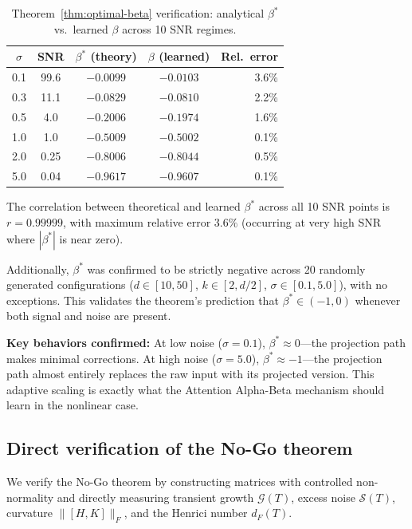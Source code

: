 \documentclass[11pt,a4paper]{article}
\theoremstyle{definition}
\begin{document}
\begin{table}[h]
\centering
\caption{Theorem~\ref{thm:optimal-beta} verification: analytical $\beta^*$
vs.\ learned $\beta$ across 10 SNR regimes.}
\label{tab:theorem2}
\begin{tabular}{@{}ccccr@{}}
\toprule
$\sigma$ & SNR & $\beta^*$ (theory) & $\beta$ (learned) & Rel.\ error \\
\midrule
0.1 & 99.6 & $-0.0099$ & $-0.0103$ & 3.6\% \\
0.3 & 11.1 & $-0.0829$ & $-0.0810$ & 2.2\% \\
0.5 & 4.0  & $-0.2006$ & $-0.1974$ & 1.6\% \\
1.0 & 1.0  & $-0.5009$ & $-0.5002$ & 0.1\% \\
2.0 & 0.25 & $-0.8006$ & $-0.8044$ & 0.5\% \\
5.0 & 0.04 & $-0.9617$ & $-0.9607$ & 0.1\% \\
\bottomrule
\end{tabular}
\end{table}

The correlation between theoretical and learned $\beta^*$ across all 10
SNR points is $r = 0.99999$, with maximum relative error $3.6\%$
(occurring at very high SNR where $|\beta^*|$ is near zero).

Additionally, $\beta^*$ was confirmed to be strictly negative across 20
randomly generated configurations ($d \in [10,50]$, $k \in [2, d/2]$,
$\sigma \in [0.1, 5.0]$), with no exceptions. This validates the
theorem's prediction that $\beta^* \in (-1, 0)$ whenever both signal
and noise are present.

\textbf{Key behaviors confirmed:}
At low noise ($\sigma = 0.1$), $\beta^* \approx 0$---the projection
path makes minimal corrections. At high noise ($\sigma = 5.0$),
$\beta^* \approx -1$---the projection path almost entirely replaces
the raw input with its projected version. This adaptive scaling is
exactly what the Attention Alpha-Beta mechanism should learn in the
nonlinear case.

\subsection{Direct verification of the No-Go theorem}
\label{sec:nogo-verify}

We verify the No-Go theorem by constructing matrices with controlled
non-normality and directly measuring transient growth $\mathcal{G}(T)$,
excess noise $\mathcal{S}(T)$, curvature $\|[H,K]\|_F$, and the
Henrici number $d_F(T)$.
\end{document}
